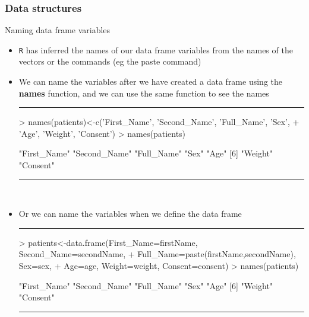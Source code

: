 \documentclass{beamer}
\begin{document}
\begin{frame}[fragile]
	\frametitle{Data structures}
	\centering \LARGE Naming data frame variables
	\begin{itemize}
		\small
		\item \texttt{R} has inferred the names of our data frame variables from the names of the vectors or the commands (eg the paste command)
		\item We can name the variables after we have created a data frame using the \textbf{names} function, and we can use the same function to see the names
\rule{\textwidth}{0.4pt}
\tiny
\begin{Schunk}
\begin{Sinput}
> names(patients)<-c('First_Name', 'Second_Name', 'Full_Name', 'Sex',
+ 		   'Age', 'Weight', 'Consent')
> names(patients)
\end{Sinput}
\begin{Soutput}
[1] "First_Name"  "Second_Name" "Full_Name"   "Sex"         "Age"        
[6] "Weight"      "Consent"    
\end{Soutput}
\end{Schunk}
\rule{\textwidth}{0.4pt}\\
\vspace{10pt}
\small
		\item Or we can name the variables when we define the data frame
\rule{\textwidth}{0.4pt}
\tiny
\begin{Schunk}
\begin{Sinput}
> patients<-data.frame(First_Name=firstName, Second_Name=secondName,
+ 		     Full_Name=paste(firstName,secondName), Sex=sex,
+ 		     Age=age, Weight=weight, Consent=consent)
> names(patients)
\end{Sinput}
\begin{Soutput}
[1] "First_Name"  "Second_Name" "Full_Name"   "Sex"         "Age"        
[6] "Weight"      "Consent"    
\end{Soutput}
\end{Schunk}
\rule{\textwidth}{0.4pt}\\
\small
	\end{itemize}
\end{frame}
\end{document}
